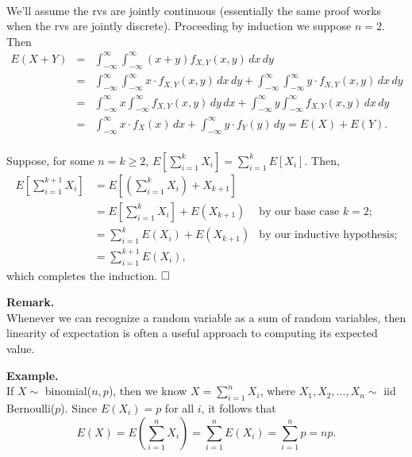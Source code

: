 \documentclass[12pt]{article}
\begin{document}
\\
\noindent We'll assume the rvs are jointly continuous (essentially the same proof works when the rvs are jointly discrete).
Proceeding by induction we suppose $n = 2$. Then
\begin{eqnarray*}
    E(X + Y) &=& \int_{-\infty}^{\infty} \int_{-\infty}^{\infty} (x + y) f_{X, Y}(x, y) \,dx \,dy \\
    &=& \int_{-\infty}^{\infty} \int_{-\infty}^{\infty} x \cdot f_{X, Y}(x, y) \,dx \,dy + \int_{-\infty}^{\infty} \int_{-\infty}^{\infty} y \cdot f_{X, Y}(x, y) \,dx \,dy \\
    &=& \int_{-\infty}^{\infty} x \int_{-\infty}^{\infty} f_{X, Y}(x, y) \,dy \,dx + \int_{-\infty}^{\infty} y \int_{-\infty}^{\infty} f_{X, Y}(x, y) \,dx \,dy \\
    &=& \int_{-\infty}^{\infty} x \cdot f_X(x) \,dx + \int_{-\infty}^{\infty} y \cdot f_Y(y) \,dy = E(X)+E(Y).\\
\end{eqnarray*}

\noindent Suppose, for some $n = k \geq 2$, $E\left[\sum_{i=1}^k X_i\right] = \sum_{i=1}^k E[X_i].$
Then,
\begin{align*}
    E\left[\sum_{i=1}^{k+1} X_i\right] &= E\left[\left(\sum_{i=1}^k X_i\right) + X_{k+1}\right] \\
    &= E\left[\sum_{i=1}^k X_i\right] + E(X_{k+1}) & \text{by our base case }k=2;\\
    &= \sum_{i=1}^{k} E(X_i) + E(X_{k+1}) & \text{by our inductive hypothesis};\\
    &= \sum_{i=1}^{k+1} E(X_i),
\end{align*}
which completes the induction. $\hfill \square$

\vspace{0.75cm}

\noindent \textbf{Remark.} \\
Whenever we can recognize a random variable as a sum of random variables, then linearity of expectation is often a useful approach to computing its expected value.

\vspace{0.75cm}

\noindent \textbf{Example.}\label{expectedvalueofbinomial} \\
If $X \sim$ binomial($n, p$), then we know $X = \sum_{i=1}^n X_i$, where $X_1, X_2, \dots, X_n \sim$ iid Bernoulli($p$). Since $E(X_i) = p$ for all $i$, it follows that
\begin{equation*}
    E(X) = E\left(\sum_{i=1}^n X_i \right) = \sum_{i=1}^n E(X_i) = \sum_{i=1}^n p = np.
\end{equation*}
\end{document}
